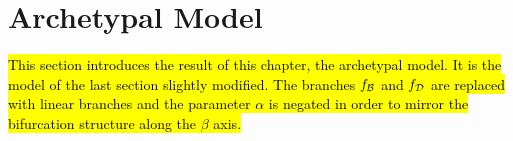 \section{Archetypal Model}
\label{sec:setup.arch}

\hl{
	This section introduces the result of this chapter, the archetypal model.
	It is the model of the last section slightly modified.
	The branches $f_{\mathcal{B}}$ and $f_{\mathcal{D}}$ are replaced with linear branches and the parameter $\alpha$ is negated in order to mirror the bifurcation structure along the $\beta$ axis.
}



